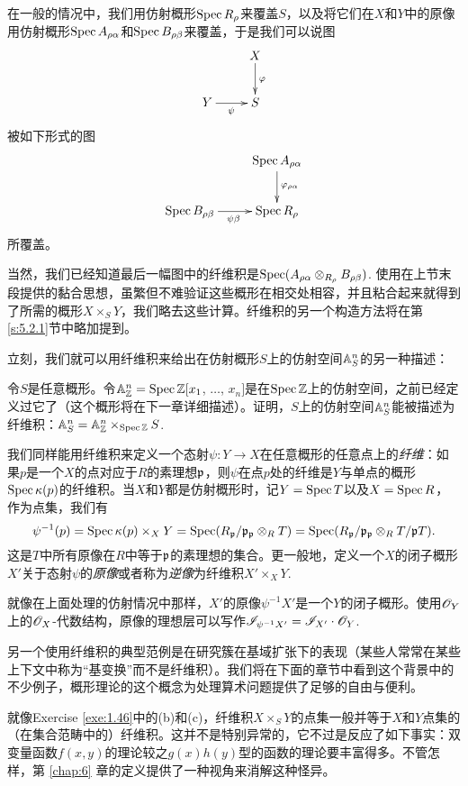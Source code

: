 在一般的情况中，我们用仿射概形$\operatorname{Spec} R_\rho$来覆盖$S$，以及将它们在$X$和$Y$中的原像用仿射概形$\operatorname{Spec} A_{\rho\alpha}$和$\operatorname{Spec} B_{\rho\beta}$来覆盖，于是我们可以说图
\[
	\xymatrix{
	&X\ar[d]^\varphi\\
	Y\ar[r]_\psi &S
	}
\]
被如下形式的图
\[
	\xymatrix{
	&\spec A_{\rho\alpha}\ar[d]^{\varphi_{\rho\alpha}}\\
	\spec B_{\rho\beta}\ar[r]_{\psi\beta} &\spec R_{\rho}
	}
\]
所覆盖。

当然，我们已经知道最后一幅图中的纤维积是$\operatorname{Spec}(A_{\rho\alpha}\otimes_{R_\rho}B_{\rho\beta})$. 使用在上节末段提供的黏合思想，虽繁但不难验证这些概形在相交处相容，并且粘合起来就得到了所需的概形$X\times_S Y$，我们略去这些计算。纤维积的另一个构造方法将在第\ref{s:5.2.1}节中略加提到。

立刻，我们就可以用纤维积来给出在仿射概形$S$上的仿射空间$\mathbb{A}_S^n$的另一种描述：

\begin{exe}\label{exe:1.47}
令$S$是任意概形。令$\mathbb{A}_{\mathbb{Z}}^n=\operatorname{Spec} \mathbb{Z}[x_1$, $\dots$, $x_n]$是在$\operatorname{Spec} \mathbb{Z}$上的仿射空间，之前已经定义过它了（这个概形将在下一章详细描述）。证明，$S$上的仿射空间$\mathbb{A}_S^n$能被描述为纤维积：$\mathbb{A}_S^n=\mathbb{A}_{\mathbb{Z}}^n\times_{\operatorname{Spec} \mathbb{Z}} S$.
\end{exe}

我们同样能用纤维积来定义一个态射$\psi:Y\to X$在任意概形的任意点上的\textit{纤维}：如果$p$是一个$X$的点对应于$R$的素理想$\mathfrak{p}$，则$\psi$在点$p$处的纤维是$Y$与单点的概形$\operatorname{Spec} \kappa(p)$的纤维积。当$X$和$Y$都是仿射概形时，记$Y=\operatorname{Spec} T$以及$X=\operatorname{Spec} R$，作为点集，我们有
\[
	\psi^{-1}(p)=\operatorname{Spec} \kappa(p)\times_X Y=\operatorname{Spec} (R_{\mathfrak{p}} /\mathfrak{p}_{\mathfrak{p}} \otimes_R T)=\operatorname{Spec} (R_{\mathfrak{p}}/\mathfrak{p}_{\mathfrak{p}} \otimes_R T/\mathfrak{p} T).
\]
这是$T$中所有原像在$R$中等于$\mathfrak{p}$的素理想的集合。更一般地，定义一个$X$的闭子概形$X'$关于态射$\psi$的\textit{原像}或者称为\textit{逆像}为纤维积$X'\times_X Y$.

就像在上面处理的仿射情况中那样，$X'$的原像$\psi^{-1}X'$是一个$Y$的闭子概形。使用$\mathscr{O}_Y$上的$\mathscr{O}_X$-代数结构，原像的理想层可以写作$\mathscr{I}_{\psi^{-1} X'}=\mathscr{I}_{X'}\cdot \mathscr{O}_Y$.

另一个使用纤维积的典型范例是在研究簇在基域扩张下的表现（某些人常常在某些上下文中称为“基变换”而不是纤维积）。我们将在下面的章节中看到这个背景中的不少例子，概形理论的这个概念为处理算术问题提供了足够的自由与便利。

就像Exercise \ref{exe:1.46}中的(b)和(c)，纤维积$X\times_S Y$的点集一般并等于$X$和$Y$点集的（在集合范畴中的）纤维积。这并不是特别异常的，它不过是反应了如下事实：双变量函数$f(x,y)$的理论较之$g(x)h(y)$型的函数的理论要丰富得多。不管怎样，第 \ref{chap:6} 章的定义提供了一种视角来消解这种怪异。

